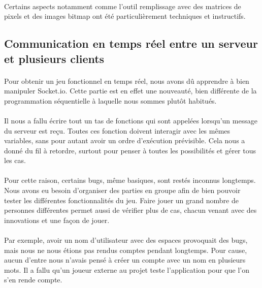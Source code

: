 \documentclass[11pt,a4paper]{article}
\begin{document}
            \paragraph{}
            Certains aspects notamment comme l'outil remplissage avec des matrices de pixels et des images bitmap 
            ont été particulièrement techniques et instructifs.
        \subsection*{Communication en temps réel entre un serveur et plusieurs clients}
            \paragraph{}
            Pour obtenir un jeu fonctionnel en temps réel, nous avons dû apprendre à bien manipuler Socket.io.
            Cette partie est en effet une nouveauté,
            bien différente de la programmation séquentielle à laquelle nous sommes plutôt habitués.
            \paragraph{}
            Il nous a fallu écrire tout un tas de fonctions qui sont appelées lorsqu'un message du serveur est reçu.
            Toutes ces fonction doivent interagir avec les mêmes variables, sans pour autant avoir un ordre d'exécution prévisible.
            Cela nous a donné du fil à retordre, surtout pour penser à toutes les possibilités et gérer tous les cas.
            \paragraph{}
            Pour cette raison, certains bugs, même basiques, sont restés inconnus longtemps.
            Nous avons eu besoin d'organiser des parties en groupe afin de bien pouvoir tester les différentes fonctionnalités du jeu.
            Faire jouer un grand nombre de personnes différentes permet aussi de vérifier plus de cas,
            chacun venant avec des innovations et une façon de jouer.
            \paragraph{}
            Par exemple, avoir un nom d'utilisateur avec des espaces provoquait des bugs,
            mais nous ne nous étions pas rendus comptes pendant longtemps.
            Pour cause, aucun d'entre nous n'avais pensé à créer un compte avec un nom en plusieurs mots.
            Il a fallu qu'un joueur externe au projet teste l'application pour que l'on s'en rende compte.
\end{document}
